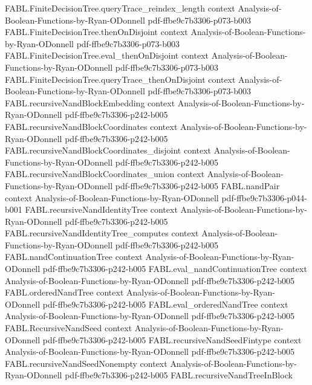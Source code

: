 \begin{theorem}
\proofstep
  {FABL.FiniteDecisionTree.queryTrace_reindex_length}
  {context}
  {Analysis-of-Boolean-Functions-by-Ryan-ODonnell}
  {pdf-ffbe9c7b3306-p073-b003}
\proofstep
  {FABL.FiniteDecisionTree.thenOnDisjoint}
  {context}
  {Analysis-of-Boolean-Functions-by-Ryan-ODonnell}
  {pdf-ffbe9c7b3306-p073-b003}
\proofstep
  {FABL.FiniteDecisionTree.eval_thenOnDisjoint}
  {context}
  {Analysis-of-Boolean-Functions-by-Ryan-ODonnell}
  {pdf-ffbe9c7b3306-p073-b003}
\proofstep
  {FABL.FiniteDecisionTree.queryTrace_thenOnDisjoint}
  {context}
  {Analysis-of-Boolean-Functions-by-Ryan-ODonnell}
  {pdf-ffbe9c7b3306-p073-b003}
\proofstep
  {FABL.recursiveNandBlockEmbedding}
  {context}
  {Analysis-of-Boolean-Functions-by-Ryan-ODonnell}
  {pdf-ffbe9c7b3306-p242-b005}
\proofstep
  {FABL.recursiveNandBlockCoordinates}
  {context}
  {Analysis-of-Boolean-Functions-by-Ryan-ODonnell}
  {pdf-ffbe9c7b3306-p242-b005}
\proofstep
  {FABL.recursiveNandBlockCoordinates_disjoint}
  {context}
  {Analysis-of-Boolean-Functions-by-Ryan-ODonnell}
  {pdf-ffbe9c7b3306-p242-b005}
\proofstep
  {FABL.recursiveNandBlockCoordinates_union}
  {context}
  {Analysis-of-Boolean-Functions-by-Ryan-ODonnell}
  {pdf-ffbe9c7b3306-p242-b005}
\proofstep
  {FABL.nandPair}
  {context}
  {Analysis-of-Boolean-Functions-by-Ryan-ODonnell}
  {pdf-ffbe9c7b3306-p044-b001}
\proofstep
  {FABL.recursiveNandIdentityTree}
  {context}
  {Analysis-of-Boolean-Functions-by-Ryan-ODonnell}
  {pdf-ffbe9c7b3306-p242-b005}
\proofstep
  {FABL.recursiveNandIdentityTree_computes}
  {context}
  {Analysis-of-Boolean-Functions-by-Ryan-ODonnell}
  {pdf-ffbe9c7b3306-p242-b005}
\proofstep
  {FABL.nandContinuationTree}
  {context}
  {Analysis-of-Boolean-Functions-by-Ryan-ODonnell}
  {pdf-ffbe9c7b3306-p242-b005}
\proofstep
  {FABL.eval_nandContinuationTree}
  {context}
  {Analysis-of-Boolean-Functions-by-Ryan-ODonnell}
  {pdf-ffbe9c7b3306-p242-b005}
\proofstep
  {FABL.orderedNandTree}
  {context}
  {Analysis-of-Boolean-Functions-by-Ryan-ODonnell}
  {pdf-ffbe9c7b3306-p242-b005}
\proofstep
  {FABL.eval_orderedNandTree}
  {context}
  {Analysis-of-Boolean-Functions-by-Ryan-ODonnell}
  {pdf-ffbe9c7b3306-p242-b005}
\proofstep
  {FABL.RecursiveNandSeed}
  {context}
  {Analysis-of-Boolean-Functions-by-Ryan-ODonnell}
  {pdf-ffbe9c7b3306-p242-b005}
\proofstep
  {FABL.recursiveNandSeedFintype}
  {context}
  {Analysis-of-Boolean-Functions-by-Ryan-ODonnell}
  {pdf-ffbe9c7b3306-p242-b005}
\proofstep
  {FABL.recursiveNandSeedNonempty}
  {context}
  {Analysis-of-Boolean-Functions-by-Ryan-ODonnell}
  {pdf-ffbe9c7b3306-p242-b005}
\proofstep
  {FABL.recursiveNandTreeInBlock}

\end{theorem}
